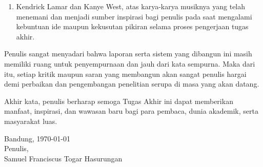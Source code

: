 \begin{enumerate}
    \item Kendrick Lamar dan Kanye West, atas karya-karya musiknya yang telah menemani dan menjadi sumber inspirasi bagi penulis pada saat mengalami kebuntuan ide maupun kekusutan pikiran selama proses pengerjaan tugas akhir.
\end{enumerate}

Penulis sangat menyadari bahwa laporan serta sistem yang dibangun ini masih memiliki ruang untuk penyempurnaan dan jauh dari kata sempurna. Maka dari itu, setiap kritik maupun saran yang membangun akan sangat penulis hargai demi perbaikan dan pengembangan penelitian serupa di masa yang akan datang.

Akhir kata, penulis berharap semoga Tugas Akhir ini dapat memberikan manfaat, inspirasi, dan wawasan baru bagi para pembaca, dunia akademik, serta masyarakat luas.

\begin{flushright}
    Bandung, \today\\
    \vspace{1.5cm}
    Penulis, \\
    \vspace{1.5cm}
    Samuel Franciscus Togar Hasurungan
\end{flushright}